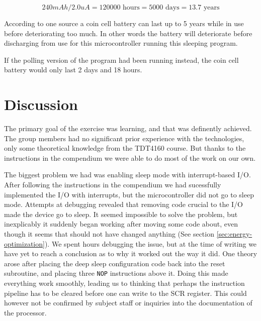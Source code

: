 \[
	240 mAh / 2.0 uA = 120 000 \text{~hours} = 5000 \text{~days} = 13.7 \text{~years}
\]

According to one source \cite{cr2032} a coin cell battery can last up to 5 years while in use before deteriorating too much. In other words the battery will deteriorate before discharging from use for this microcontroller running this sleeping program.

If the polling version of the program had been running instead, the coin cell battery would only last 2 days and 18 hours.

\section{Discussion}
The primary goal of the exercise was learning, and that was definently achieved. The group members had no significant prior experience with the technologies, only some theoretical knowledge from the TDT4160 course. But thanks to the instructions in the compendium we were able to do most of the work on our own.

The biggest problem we had was enabling sleep mode with interrupt-based I/O. After following the instructions in the compendium we had sucessfully implemented the I/O with interrupts, but the microcontroller did not go to sleep mode. Attempts at debugging revealed that removing code crucial to the I/O made the device go to sleep. It seemed impossible to solve the problem, but inexplicably it suddenly began working after moving some code about, even though it seems that should not have changed anything (See section \ref{sec:energy-optimization}). We spent hours debugging the issue, but at the time of writing we have yet to reach a conclusion as to why it worked out the way it did. One theory arose after placing the deep sleep configuration code back into the reset subroutine, and placing three \texttt{NOP} instructions above it. Doing this made everything work smoothly, leading us to thinking that perhaps the instruction pipeline has to be cleared before one can write to the SCR register. This could however not be confirmed by subject staff or inquiries into the documentation of the processor.
